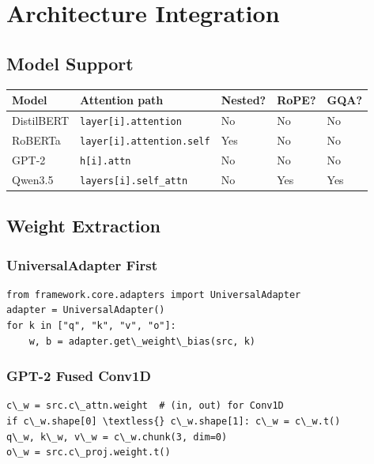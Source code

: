 \section{Architecture Integration}

\subsection{Model Support}

\begin{table}[H]
\centering
\small
\begin{tabular}{lllll}
\toprule
\textbf{Model} & \textbf{Attention path} & \textbf{Nested?} & \textbf{RoPE?} & \textbf{GQA?} \\
\midrule
DistilBERT & \texttt{layer[i].attention} & No & No & No \\
RoBERTa & \texttt{layer[i].attention.self} & Yes & No & No \\
GPT-2 & \texttt{h[i].attn} & No & No & No \\
Qwen3.5 & \texttt{layers[i].self\_attn} & No & Yes & Yes \\
\bottomrule
\end{tabular}
\end{table}

\subsection{Weight Extraction}

\subsubsection{UniversalAdapter First}

\begin{lstlisting}
from framework.core.adapters import UniversalAdapter
adapter = UniversalAdapter()
for k in ["q", "k", "v", "o"]:
    w, b = adapter.get\_weight\_bias(src, k)
\end{lstlisting}

\subsubsection{GPT-2 Fused Conv1D}

\begin{lstlisting}
c\_w = src.c\_attn.weight  # (in, out) for Conv1D
if c\_w.shape[0] \textless{} c\_w.shape[1]: c\_w = c\_w.t()
q\_w, k\_w, v\_w = c\_w.chunk(3, dim=0)
o\_w = src.c\_proj.weight.t()
\end{lstlisting}

